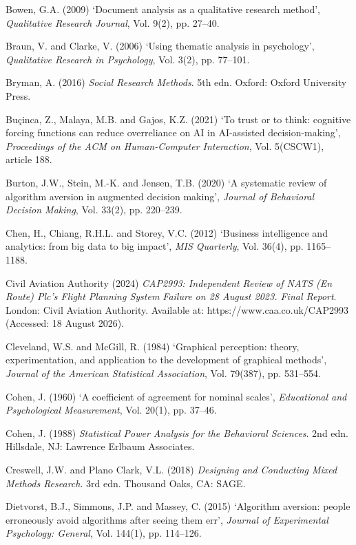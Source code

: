 \documentclass[12pt,a4paper]{article}
\begin{document}
{\rf Bowen, G.A. (2009) `Document analysis as a qualitative research method', \emph{Qualitative Research Journal}, Vol. 9(2), pp. 27--40.

\rf Braun, V. and Clarke, V. (2006) `Using thematic analysis in psychology', \emph{Qualitative Research in Psychology}, Vol. 3(2), pp. 77--101.

\rf Bryman, A. (2016) \emph{Social Research Methods}. 5th edn. Oxford: Oxford University Press.

\rf Buçinca, Z., Malaya, M.B. and Gajos, K.Z. (2021) `To trust or to think: cognitive forcing functions can reduce overreliance on AI in AI-assisted decision-making', \emph{Proceedings of the ACM on Human-Computer Interaction}, Vol. 5(CSCW1), article 188.

\rf Burton, J.W., Stein, M.-K. and Jensen, T.B. (2020) `A systematic review of algorithm aversion in augmented decision making', \emph{Journal of Behavioral Decision Making}, Vol. 33(2), pp. 220--239.

\rf Chen, H., Chiang, R.H.L. and Storey, V.C. (2012) `Business intelligence and analytics: from big data to big impact', \emph{MIS Quarterly}, Vol. 36(4), pp. 1165--1188.

\rf Civil Aviation Authority (2024) \emph{CAP2993: Independent Review of NATS (En Route) Plc's Flight Planning System Failure on 28 August 2023. Final Report}. London: Civil Aviation Authority. Available at: https://www.caa.co.uk/CAP2993 (Accessed: 18 August 2026).

\rf Cleveland, W.S. and McGill, R. (1984) `Graphical perception: theory, experimentation, and application to the development of graphical methods', \emph{Journal of the American Statistical Association}, Vol. 79(387), pp. 531--554.

\rf Cohen, J. (1960) `A coefficient of agreement for nominal scales', \emph{Educational and Psychological Measurement}, Vol. 20(1), pp. 37--46.

\rf Cohen, J. (1988) \emph{Statistical Power Analysis for the Behavioral Sciences}. 2nd edn. Hillsdale, NJ: Lawrence Erlbaum Associates.

\rf Creswell, J.W. and Plano Clark, V.L. (2018) \emph{Designing and Conducting Mixed Methods Research}. 3rd edn. Thousand Oaks, CA: SAGE.

\rf Dietvorst, B.J., Simmons, J.P. and Massey, C. (2015) `Algorithm aversion: people erroneously avoid algorithms after seeing them err', \emph{Journal of Experimental Psychology: General}, Vol. 144(1), pp. 114--126.

}
\end{document}
